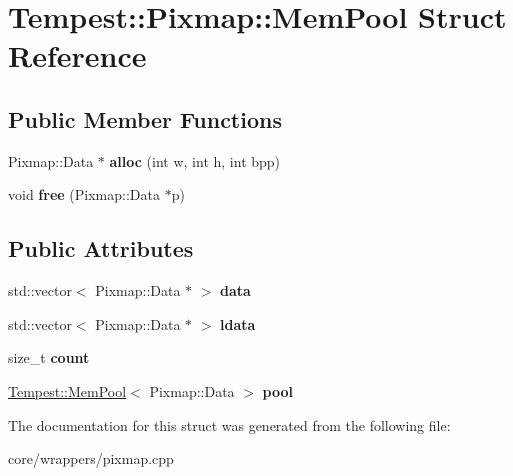 \hypertarget{struct_pixmap_1_1_mem_pool}{\section{Tempest\+:\+:Pixmap\+:\+:Mem\+Pool Struct Reference}
\label{struct_pixmap_1_1_mem_pool}
}
\subsection*{Public Member Functions}
\begin{DoxyCompactItemize}
\item 
\hypertarget{struct_pixmap_1_1_mem_pool_a29ed1ad9ee5111c5e4e2d21387f8a4c5}{Pixmap\+::\+Data $\ast$ {\bfseries alloc} (int w, int h, int bpp)}\label{struct_pixmap_1_1_mem_pool_a29ed1ad9ee5111c5e4e2d21387f8a4c5}

\item 
\hypertarget{struct_pixmap_1_1_mem_pool_ae573a17f4ddd19c3241d1135eae98ea5}{void {\bfseries free} (Pixmap\+::\+Data $\ast$p)}\label{struct_pixmap_1_1_mem_pool_ae573a17f4ddd19c3241d1135eae98ea5}

\end{DoxyCompactItemize}
\subsection*{Public Attributes}
\begin{DoxyCompactItemize}
\item 
\hypertarget{struct_pixmap_1_1_mem_pool_a4e7bee85c00a52597143b2cfd8aa08a3}{std\+::vector$<$ Pixmap\+::\+Data $\ast$ $>$ {\bfseries data}}\label{struct_pixmap_1_1_mem_pool_a4e7bee85c00a52597143b2cfd8aa08a3}

\item 
\hypertarget{struct_pixmap_1_1_mem_pool_abd19531c8440b52edb072b3a7466e639}{std\+::vector$<$ Pixmap\+::\+Data $\ast$ $>$ {\bfseries ldata}}\label{struct_pixmap_1_1_mem_pool_abd19531c8440b52edb072b3a7466e639}

\item 
\hypertarget{struct_pixmap_1_1_mem_pool_aedffa73c35e4295cc882fb2be2296abf}{size\+\_\+t {\bfseries count}}\label{struct_pixmap_1_1_mem_pool_aedffa73c35e4295cc882fb2be2296abf}

\item 
\hypertarget{struct_pixmap_1_1_mem_pool_ac03f8358fa759b622ca332e621274261}{\hyperlink{class_tempest_1_1_mem_pool}{Tempest\+::\+Mem\+Pool}$<$ Pixmap\+::\+Data $>$ {\bfseries pool}}\label{struct_pixmap_1_1_mem_pool_ac03f8358fa759b622ca332e621274261}

\end{DoxyCompactItemize}


The documentation for this struct was generated from the following file\+:\begin{DoxyCompactItemize}
\item 
core/wrappers/pixmap.\+cpp\end{DoxyCompactItemize}
